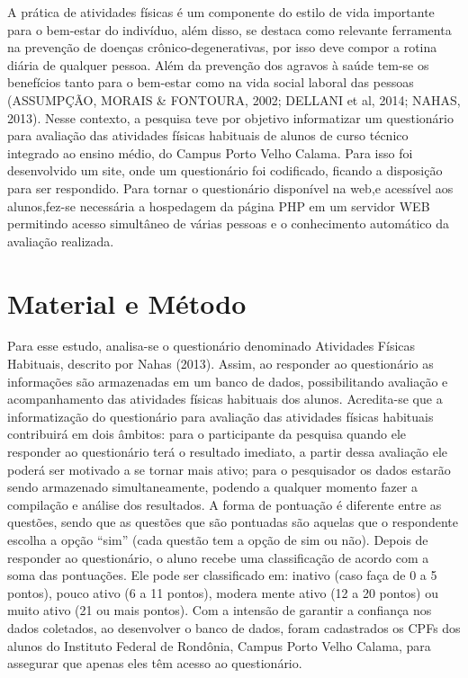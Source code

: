 \documentclass[article,12pt,onesidea,4paper,english,brazil,]{abntex2}
\begin{document}
A prática de atividades físicas é um componente do estilo de vida importante para o bem-estar do indivíduo, além disso, se destaca como relevante ferramenta na prevenção de doenças crônico-degenerativas, por isso deve compor a rotina diária de qualquer pessoa. Além da prevenção dos agravos à saúde tem-se os benefícios tanto para o bem-estar como na vida social laboral das pessoas (ASSUMPÇÃO, MORAIS \& FONTOURA, 2002; DELLANI et al, 2014; NAHAS, 2013).
Nesse contexto, a pesquisa teve por objetivo informatizar um questionário para avaliação das atividades físicas habituais de alunos de curso técnico integrado ao ensino médio, do Campus Porto Velho Calama. Para isso foi desenvolvido um site, onde um questionário foi codificado, ficando a disposição para ser respondido. Para tornar o questionário disponível na web,e acessível aos alunos,fez-se necessária a hospedagem da página PHP em um servidor WEB permitindo acesso simultâneo de várias pessoas e o conhecimento automático da avaliação realizada.

	
	\section*{Material e Método}
	
Para esse estudo, analisa-se o questionário denominado Atividades Físicas Habituais, descrito por Nahas (2013). Assim, ao responder ao questionário as informações são armazenadas em um banco de dados, possibilitando avaliação e acompanhamento das atividades físicas habituais dos alunos.
Acredita-se que a informatização do questionário para avaliação das atividades físicas habituais contribuirá em dois âmbitos: para o participante da pesquisa quando ele responder ao questionário terá o resultado imediato, a partir dessa avaliação ele poderá ser motivado a se tornar mais ativo; para o pesquisador os dados estarão sendo armazenado simultaneamente, podendo a qualquer momento fazer a compilação e análise dos resultados.
A forma de pontuação é diferente entre as questões, sendo que as questões que são pontuadas são aquelas que o respondente escolha a opção “sim” (cada questão tem a opção de sim ou não). Depois de responder ao questionário, o aluno recebe uma classificação de acordo com a soma das pontuações. Ele pode ser classificado em: inativo (caso faça de 0 a 5 pontos), pouco ativo (6 a 11 pontos), modera mente ativo (12 a 20 pontos) ou muito ativo (21 ou mais pontos).
Com a intensão de garantir a confiança nos dados coletados, ao desenvolver o banco de dados, foram cadastrados os CPFs dos alunos do Instituto Federal de Rondônia, Campus Porto Velho Calama, para assegurar que apenas eles têm acesso ao questionário.
\end{document}
